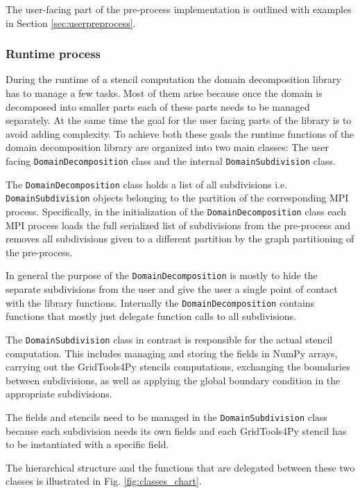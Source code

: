 The user-facing part of the pre-process implementation is outlined with examples in Section \ref{sec:userpreprocess}.

\subsubsection{Runtime process}
During the runtime of a stencil computation the domain decomposition library has to manage a few tasks.
Most of them arise because once the domain is decomposed into smaller parts each of these parts needs to be managed separately.
At the same time the goal for the user facing parts of the library is to avoid adding complexity.
To achieve both these goals the runtime functions of the domain decomposition library are organized into two main classes:
The user facing \texttt{DomainDecomposition} class and the internal \texttt{DomainSubdivision} class.

The \texttt{DomainDecomposition} class holds a list of all subdivisions i.e. \texttt{DomainSubdivision} objects belonging to the partition of the corresponding MPI process.
Specifically, in the initialization of the \texttt{DomainDecomposition} class each MPI process loads the full serialized list of subdivisions from the pre-process and removes all subdivisions given to a different partition by the graph partitioning of the pre-process.

In general the purpose of the \texttt{DomainDecomposition} is mostly to hide the separate subdivisions from the user and give the user a single point of contact with the library functions.
Internally the \texttt{DomainDecomposition} contains functions that mostly just delegate function calls to all subdivisions.

The \texttt{DomainSubdivision} class in contrast is responsible for the actual stencil computation.
This includes managing and storing the fields in NumPy arrays, carrying out the GridTools4Py stencils computations, exchanging the boundaries between subdivisions, as well as applying the global boundary condition in the appropriate subdivisions.

The fields and stencils need to be managed in the \texttt{DomainSubdivision} class because each subdivision needs its own fields and each GridTools4Py stencil has to be instantiated with a specific field.

The hierarchical structure and the functions that are delegated between these two classes is illustrated in Fig. \ref{fig:classes_chart}.

